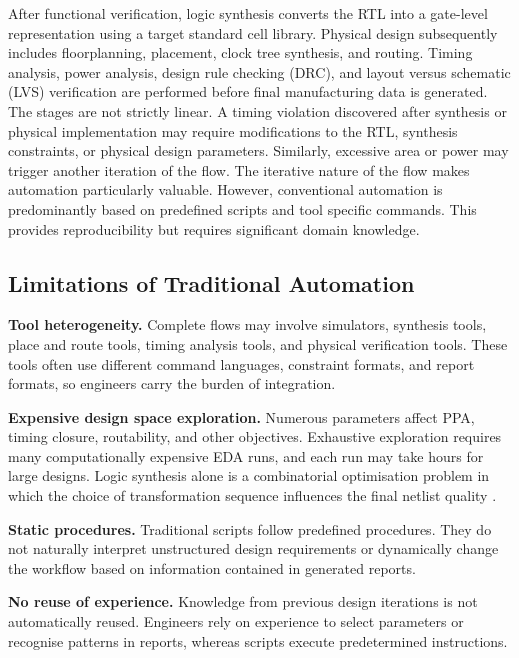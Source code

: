 \documentclass[conference]{IEEEtran}
\begin{document}
\noindent After functional verification, logic synthesis converts the RTL into a gate-level representation using a target standard cell library. Physical design subsequently includes floorplanning, placement, clock tree synthesis, and routing. Timing analysis, power analysis, design rule checking (DRC), and layout versus schematic (LVS) verification are performed before final manufacturing data is generated.\\

\noindent The stages are not strictly linear. A timing violation discovered after synthesis or physical implementation may require modifications to the RTL, synthesis constraints, or physical design parameters. Similarly, excessive area or power may trigger another iteration of the flow. The iterative nature of the flow makes automation particularly valuable. However, conventional automation is predominantly based on predefined scripts and tool specific commands. This provides reproducibility but requires significant domain knowledge.

\subsection{Limitations of Traditional Automation} \label{B2}

\noindent \textbf{Tool heterogeneity.} Complete flows may involve simulators, synthesis tools, place and route tools, timing analysis tools, and physical verification tools. These tools often use different command languages, constraint formats, and report formats, so engineers carry the burden of integration.

\noindent \textbf{Expensive design space exploration.} Numerous parameters affect PPA, timing closure, routability, and other objectives. Exhaustive exploration requires many computationally expensive EDA runs, and each run may take hours for large designs. Logic synthesis alone is a combinatorial optimisation problem in which the choice of transformation sequence influences the final netlist quality \cite{P9_Chowdhury2021}.

\noindent \textbf{Static procedures.} Traditional scripts follow predefined procedures. They do not naturally interpret unstructured design requirements or dynamically change the workflow based on information contained in generated reports.

\noindent \textbf{No reuse of experience.} Knowledge from previous design iterations is not automatically reused. Engineers rely on experience to select parameters or recognise patterns in reports, whereas scripts execute predetermined instructions.
\end{document}
